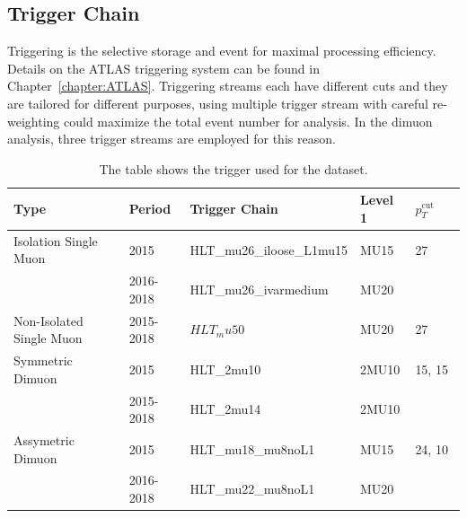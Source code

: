 

\subsection{Trigger Chain}
\label{section:trigger}
Triggering is the selective storage and event for maximal processing efficiency. Details on the ATLAS triggering system can be found in Chapter~\ref{chapter:ATLAS}.
Triggering streams each have different cuts and they are tailored for different purposes, using multiple trigger stream with careful re-weighting could maximize the total event number for analysis. In the dimuon analysis, three trigger streams are employed for this reason.

\begin{table}[!htb]
    \begin{center}
    \caption{
        The table shows the trigger used for the dataset.
    }
\label{tab:Data Trigger}
\begin{tabular}{|l|l|l|l|l}
\hline
\textbf{Type}   & \textbf{Period}                                                         &\textbf{Trigger Chain} &\textbf{Level 1} &\textbf{$p_{T}^{\textrm{cut offline}}$}\\ \hline
Isolation Single Muon   & 2015 & HLT\_mu26\_iloose\_L1mu15 & MU15 & 27 \\ 
                        & 2016-2018  & HLT\_mu26\_ivarmedium    & MU20 & \\ \hline
Non-Isolated Single Muon & 2015-2018                                       &$HLT_mu50$& MU20& 27 \\ \hline
Symmetric Dimuon & 2015 & HLT\_2mu10 & 2MU10 & 15, 15 \\
                 & 2015-2018 & HLT\_2mu14 & 2MU10 & \\ \hline
Assymetric Dimuon & 2015 & HLT\_mu18\_mu8noL1 & MU15 & 24, 10 \\
                  & 2016-2018 & HLT\_mu22\_mu8noL1 & MU20 \\ \hline
\end{tabular}
\end{center}
\end{table}

